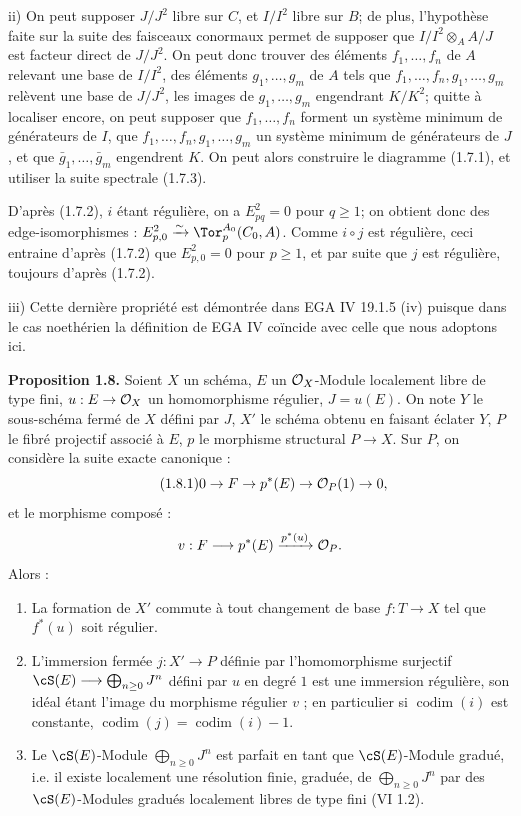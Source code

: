 ii) On peut supposer $J/J^2$ libre sur $C$, et $I/I^2$ libre sur $B$; de plus, l'hypothèse faite sur la suite des faisceaux conormaux permet de supposer que $I/I^2\otimes_A A/J$ est facteur direct de $J/J^2$. On peut donc trouver des éléments $f_1,\ldots,f_n$ de $A$ relevant une base de $I/I^2$, des éléments $g_1,\ldots,g_m$ de $A$ tels que $f_1,\ldots,f_n,g_1,\ldots,g_m$ relèvent une base de $J/J^2$, les images de $g_1,\ldots,g_m$ engendrant $K/K^2$; quitte à localiser encore, on peut supposer que $f_1,\ldots,f_n$ forment un système minimum de générateurs de $I$, que $f_1,\ldots,f_n,g_1,\ldots,g_m$ un système minimum de générateurs de $J$, et que $\bar g_1,\ldots,\bar g_m$ engendrent $K$. On peut alors construire le diagramme (1.7.1), et utiliser la suite spectrale (1.7.3).

D'après (1.7.2), $i$ étant régulière, on a $E^2_{pq}=0$ pour $q\geq1$; on obtient donc des edge-isomorphismes : $E^2_{p,0}\xrightarrow{\sim}\Tor_p^{A_0}(C_0,A)$. Comme $i\circ j$ est régulière, ceci entraine d'après (1.7.2) que $E^2_{p,0}=0$ pour $p\geq1$, et par suite que $j$ est régulière, toujours d'après (1.7.2).

iii) Cette dernière propriété est démontrée dans EGA IV 19.1.5 (iv) puisque dans le cas noethérien la définition de EGA IV coïncide avec celle que nous adoptons ici.

\textbf{Proposition 1.8.} Soient \(X\) un schéma, \(E\) un \(\mathcal O_X\)-Module localement libre de type fini, \(u:E\to\mathcal O_X\) un homomorphisme régulier, \(J=u(E)\). On note \(Y\) le
sous-schéma fermé de \(X\) défini par \(J\), \(X'\) le schéma obtenu en faisant éclater \(Y\), \(P\) le fibré projectif associé à \(E\), \(p\) le morphisme structural \(P\to X\). Sur \(P\), on considère la suite exacte canonique :
\begin{equation}\tag{1.8.1}
0\to F\to p^*(E)\to\mathcal O_P(1)\to0,
\end{equation}
et le morphisme composé :
\[
 v:F\longrightarrow p^*(E)\xrightarrow{p^*(u)}\mathcal O_P .
\]
Alors :
\begin{enumerate}[label=\roman*)]
\item La formation de \(X'\) commute à tout changement de base \(f:T\to X\) tel que \(f^*(u)\) soit régulier.
\item L'immersion fermée \(j:X'\to P\) définie par l'homomorphisme surjectif \(\cS(E)\longrightarrow\bigoplus_{n\ge0}J^n\) défini par \(u\) en degré \(1\) est une immersion régulière, son idéal étant l'image du morphisme régulier \(v\) ; en particulier si \(\operatorname{codim}(i)\) est constante, \(\operatorname{codim}(j)=\operatorname{codim}(i)-1\).
\item Le \(\cS(E)\)-Module \(\bigoplus_{n\ge0}J^n\) est parfait en tant que \(\cS(E)\)-Module gradué, i.e. il existe localement une résolution finie, graduée, de \(\bigoplus_{n\ge0}J^n\) par des \(\cS(E)\)-Modules gradués localement libres de type fini (VI 1.2).
\end{enumerate}


